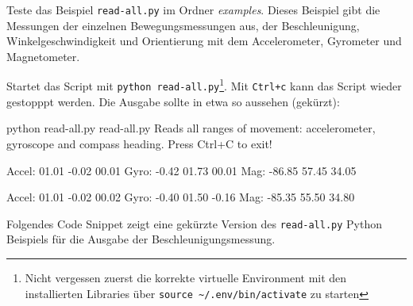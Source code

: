 \documentclass[
  11pt,
  a4paperpaper,
  oneside, openany  ,captions=tableheading
]{scrbook}
\newenvironment{Shaded}{\begin{snugshade}}{\end{snugshade}}
\newcommand{\AttributeTok}[1]{\textcolor[rgb]{0.40,0.45,0.13}{#1}}
\newcommand{\ExtensionTok}[1]{\textcolor[rgb]{0.00,0.23,0.31}{#1}}
\newcommand{\NormalTok}[1]{\textcolor[rgb]{0.00,0.23,0.31}{#1}}
\theoremstyle{definition}
\theoremstyle{remark}
\begin{document}
Teste das Beispiel \texttt{read-all.py} im Ordner \emph{examples}.
Dieses Beispiel gibt die Messungen der einzelnen Bewegungsmessungen aus,
der Beschleunigung, Winkelgeschwindigkeit und Orientierung mit dem
Accelerometer, Gyrometer und Magnetometer.

Startet das Script mit \texttt{python\ read-all.py}\footnote{Nicht
  vergessen zuerst die korrekte virtuelle Environment mit den
  installierten Libraries über
  \texttt{source\ \textasciitilde{}/.env/bin/activate} zu starten}. Mit
\texttt{Ctrl+c} kann das Script wieder gestopppt werden. Die Ausgabe
sollte in etwa so aussehen (gekürzt):

\begin{Shaded}
\begin{Highlighting}[]
\ExtensionTok{python}\NormalTok{ read{-}all.py}
\ExtensionTok{read{-}all.py}
\ExtensionTok{Reads}\NormalTok{ all ranges of movement: accelerometer, gyroscope and compass heading.}
\ExtensionTok{Press}\NormalTok{ Ctrl+C to exit!}

\ExtensionTok{Accel:}\NormalTok{ 01.01 }\AttributeTok{{-}0.02}\NormalTok{ 00.01}
\ExtensionTok{Gyro:}  \AttributeTok{{-}0.42}\NormalTok{ 01.73 00.01}
\ExtensionTok{Mag:}   \AttributeTok{{-}86.85}\NormalTok{ 57.45 34.05}

\ExtensionTok{Accel:}\NormalTok{ 01.01 }\AttributeTok{{-}0.02}\NormalTok{ 00.02}
\ExtensionTok{Gyro:}  \AttributeTok{{-}0.40}\NormalTok{ 01.50 }\AttributeTok{{-}0.16}
\ExtensionTok{Mag:}   \AttributeTok{{-}85.35}\NormalTok{ 55.50 34.80}
\end{Highlighting}
\end{Shaded}

Folgendes Code Snippet zeigt eine gekürzte Version des
\texttt{read-all.py} Python Beispiels für die Ausgabe der
Beschleunigungsmessung.
\end{document}
